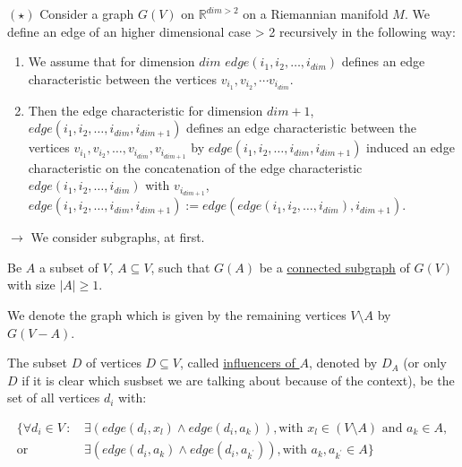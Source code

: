 \documentclass{article}
\newtheorem*{theorem A}{Theorem A}
\newtheorem*{theorem B}{N\"olker's Theorem}
\theoremstyle{remark}
\theoremstyle{remark}
\begin{document}
\begin{enumerate}
    $\left(\star\right)$ Consider a graph $G\left(V\right)$ on $\mathbb{R}^{dim > 2}$ on a Riemannian manifold $M$. We define an edge of an higher dimensional case > 2 recursively in the following way:

    \begin{enumerate}
        \item We assume that for dimension \underline{$dim$} $edge\left(i_{1}, i_{2}, \dots, i_{dim}\right)$ defines an edge characteristic between the vertices $v_{i_{1}}, v_{i_{2}}, \cdots v_{i_{dim}}$.

        \item Then the edge characteristic for dimension \underline{$dim + 1$}, $edge\left(i_{1}, i_{2}, \dots, i_{dim}, i_{dim + 1}\right)$ defines an edge characteristic between the vertices $v_{i_{1}}, v_{i_{2}}, \dots, v_{i_{dim}}, v_{i_{dim + 1}}$ by $edge\left(i_{1}, i_{2}, \dots, i_{dim}, i_{dim + 1}\right)$ induced an edge characteristic on the concatenation of the edge characteristic $edge\left(i_{1}, i_{2}, \dots, i_{dim}\right)$ with $v_{i_{dim + 1}}$, $edge\left(i_{1}, i_{2}, \dots, i_{dim}, i_{dim + 1}\right) := edge\left(edge\left(i_{1}, i_{2}, \dots, i_{dim}\right), i_{dim + 1}\right)$.
    \label{enum:edgesdim+1case}
    \end{enumerate}
\label{enum:edges}
\end{enumerate}


\vspace{0.3cm}
$\rightarrow$ We consider subgraphs, at first.

\vspace{0.3cm}
Be $A$ a subset of $V$, $A \subseteq V$, such that $G\left(A\right)$ be a \underline{connected subgraph} of $G\left(V\right)$ with size $|A| \geq 1$.

\vspace{0.3cm}
We denote the graph which is given by the remaining vertices $V \setminus A$ by $G\left(V - A\right)$.

\vspace{0.3cm}
The subset $D$ of vertices $D \subseteq V$, called \underline{influencers of $A$}, denoted by $D_{A}$ (or only $D$ if it is clear which susbset we are talking about because of the context), be the set of all vertices $d_{i}$ with:


\begin{equation*}
    \begin{split}
        \{ \forall d_{i} \in V \, : \,  &\exists \left(edge\left(d_{i}, x_{l}\right) \wedge edge\left(d_{i}, a_{k}\right)\right), \text{with } x_{l} \in \left(V \setminus A\right) \text{ and } a_{k} \in A,\\
                    \text{or} \quad     &\exists \left(edge\left(d_{i}, a_{k}\right) \wedge edge\left(d_{i}, a_{k^{\prime}}\right)\right), \text{with } a_{k}, a_{k^{\prime}} \in A \}
    \label{eq:influencers}
    \end{split}
\end{equation*}
\end{document}
